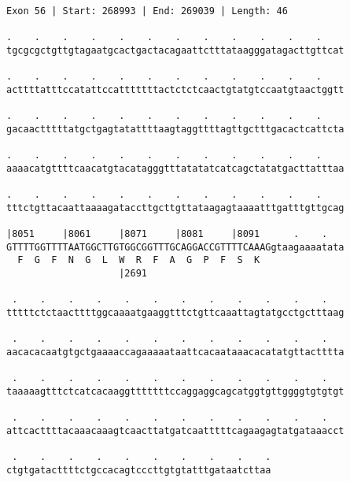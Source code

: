 \documentclass{article}
\begin{document}
\begin{Verbatim}[fontfamily=courier]
Exon 56 | Start: 268993 | End: 269039 | Length: 46

.    .    .    .    .    .    .    .    .    .    .    .    
tgcgcgctgttgtagaatgcactgactacagaattctttataagggatagacttgttcat

.    .    .    .    .    .    .    .    .    .    .    .    
acttttatttccatattccatttttttactctctcaactgtatgtccaatgtaactggtt

.    .    .    .    .    .    .    .    .    .    .    .    
gacaactttttatgctgagtatattttaagtaggttttagttgctttgacactcattcta

.    .    .    .    .    .    .    .    .    .    .    .    
aaaacatgttttcaacatgtacatagggtttatatatcatcagctatatgacttatttaa

.    .    .    .    .    .    .    .    .    .    .    .    
tttctgttacaattaaaagataccttgcttgttataagagtaaaatttgatttgttgcag

|8051     |8061     |8071     |8081     |8091      .    .   
GTTTTGGTTTTAATGGCTTGTGGCGGTTTGCAGGACCGTTTTCAAAGgtaagaaaatata
  F  G  F  N  G  L  W  R  F  A  G  P  F  S  K               
                    |2691                                   

 .    .    .    .    .    .    .    .    .    .    .    .   
tttttctctaacttttggcaaaatgaaggtttctgttcaaattagtatgcctgctttaag

 .    .    .    .    .    .    .    .    .    .    .    .   
aacacacaatgtgctgaaaaccagaaaaataattcacaataaacacatatgttactttta

 .    .    .    .    .    .    .    .    .    .    .    .   
taaaaagtttctcatcacaaggtttttttccaggaggcagcatggtgttggggtgtgtgt

 .    .    .    .    .    .    .    .    .    .    .    .   
attcacttttacaaacaaagtcaacttatgatcaatttttcagaagagtatgataaacct

 .    .    .    .    .    .    .    .    .    .
ctgtgatacttttctgccacagtcccttgtgtatttgataatcttaa
\end{Verbatim}
\newpage
\end{document}
